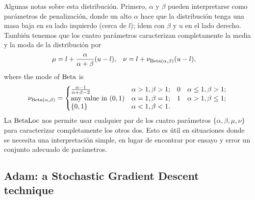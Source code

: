 Algunas notas sobre esta distribución. Primero, \(\alpha\) y \(\beta\) pueden interpretarse como parámetros de penalización, donde un alto \(\alpha\) hace que la distribución tenga una masa baja en su lado izquierdo (cerca de \( l\)); ídem con \(\beta\) y \(u\) en el lado derecho. También tenemos que los cuatro parámetros caracterizan completamente la media y la moda de la distribución por
\begin{align*}
\mu	&= l + \frac{\alpha}{\alpha + \beta} (u-l),	& \nu	&= l + \nu_{\operatorname{Beta}(\alpha, \beta)} (u-l),
\end{align*}
where the mode of \(\operatorname{Beta}\) is
	\[ \nu_{\Beta(\alpha, \beta)} =
\left\{ \begin{matrix*}[l]
\frac{\alpha - 1}{\alpha + \beta - 2}	& \alpha > 1, \beta > 1;	& 0	& \alpha \leq 1, \beta > 1;\\
\text{any value in } (0,1)				& \alpha = 1, \beta = 1;	& 1	& \alpha > 1, \beta \leq 1;\\
\{0,1\}									& \alpha < 1, \beta < 1.	& 	& \\
\end{matrix*} \right.
\]
La \(\operatorname{BetaLoc}\) nos permite usar cualquier par de los cuatro parámetros \(\{\alpha, \beta, \mu, \nu\}\) para caracterizar completamente los otros dos. Esto es útil en situaciones donde se necesita una interpretación simple, en lugar de encontrar por ensayo y error un conjunto adecuado de parámetros.

\subsection{Adam: a Stochastic Gradient Descent technique}

